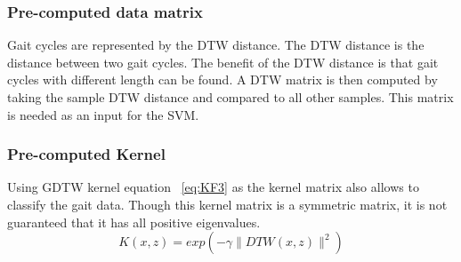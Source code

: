 \documentclass{sig-alternate}
\begin{document}
\subsubsection{Pre-computed data matrix}
	Gait cycles are represented by the DTW distance. The DTW distance is the distance between two gait cycles. The benefit of the DTW distance is that gait cycles with different length can be found. A DTW matrix is then computed by taking the sample DTW distance and compared to all other samples. This matrix is needed as an input for the SVM.	
\subsubsection{Pre-computed Kernel}
Using GDTW kernel equation ~\ref{eq:KF3} as the kernel matrix also allows to classify the gait data. Though this kernel matrix is a symmetric matrix, it is not guaranteed that it has all positive eigenvalues. 
\begin{equation} \label{eq:KF3}
K(x,z)=exp(-\gamma \parallel DTW(x,z) \parallel ^2)
\end{equation}	
\end{document}
